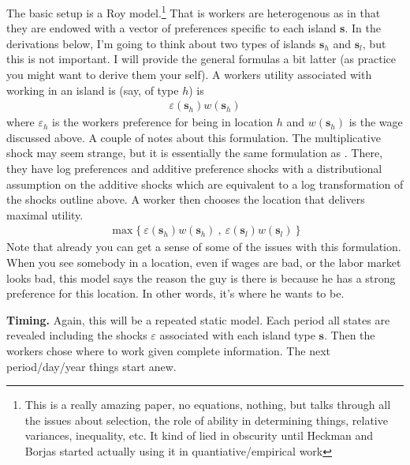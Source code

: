 \documentclass[pdftex,12pt]{article}
\begin{document}
\medskip
\noindent The basic setup is a Roy model.\footnote{This is a really amazing paper, no equations, nothing, but talks through all the issues about selection, the role of ability in determining things, relative variances, inequality, etc. It kind of lied in obscurity until Heckman and Borjas started actually using it in quantiative/empirical work} That is workers are heterogenous as in that they are endowed with a vector of preferences specific to each island \textbf{s}. In the derivations below, I'm going to think about two types of islands $\textbf{s}_h$ and $\textbf{s}_l$, but this is not important. I will provide the general formulas a bit latter (as practice you might want to derive them your self). A workers utility associated with working in an island is (say, of type $h$) is
\begin{align}
\varepsilon(\textbf{s}_h) w(\textbf{s}_h)
\end{align}
where $\varepsilon_h$ is the workers preference for being in location $h$ and $w(\textbf{s}_h)$ is the wage discussed above. A couple of notes about this formulation. The multiplicative shock may seem strange, but it is essentially the same formulation as \citet{caliendo2015trade}. There, they have log preferences and additive preference shocks with a distributional assumption on the additive shocks which are equivalent to a log transformation of the shocks outline above. A worker then chooses the location that delivers maximal utility.
\begin{align}
\max\{\ \varepsilon(\textbf{s}_h)  w(\textbf{s}_h) \ , \ \varepsilon(\textbf{s}_l)  w(\textbf{s}_l) \ \}
\label{eq:worker_choice}
\end{align}
Note that already you can get a sense of some of the issues with this formulation. When you see somebody in a location, even if wages are bad, or the labor market looks bad, this model says the reason the guy is there is because he has a strong preference for this location. In other words, it's where he wants to be.

\medskip
\noindent \textbf{Timing.} Again, this will be a repeated static model. Each period all states are revealed including the shocks $\varepsilon$ associated with each island type $\textbf{s}$. Then the workers chose where to work given complete information. The next period/day/year things start anew.
\end{document}
